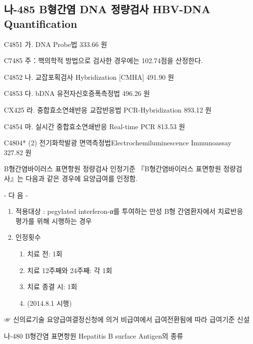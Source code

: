 \subsection{나-485 B형간염 DNA 정량검사 HBV-DNA Quantification}
C4851 가. DNA Probe법 333.66  원 \par
C7485 주：핵의학적 방법으로 검사한 경우에는 102.74점을 산정한다.\par
C4852 나. 교잡포획검사 Hybridization [CMHA] 491.90  원 \par
C4853 다. bDNA 유전자신호증폭측정법 496.26  원\par
CX425 라. 중합효소연쇄반응 교잡반응법 PCR-Hybridization 893.12  원\par
C4854 마. 실시간 중합효소연쇄반응 Real-time PCR 813.53  원\par
C4804* (2) 전기화학발광 면역측정법Electrochemiluminescence Immunoassay 327.82  원 \par

\begin{commentbox}{B형간염바이러스 표면항원 정량검사 인정기준}
『B형간염바이러스 표면항원 정량검사』는 다음과 같은 경우에 요양급여를 인정함. \par
- 다 음 -
\begin{enumerate}[가.]\tightlist
\item 적용대상 : pegylated interferon-α를 투여하는 만성 B형 간염환자에서 치료반응 평가를 위해 시행하는 경우
\item 인정횟수
	\begin{enumerate}[1)]\tightlist
	\item 치료 전: 1회
	\item 치료 12주째와 24주째: 각 1회
	\item 치료 종결 시: 1회
	\item (2014.8.1 시행)
  	\end{enumerate}
\end{enumerate}  	
☞ 신의료기술 요양급여결정신청에 의거 비급여에서 급여전환됨에 따라 급여기준 신설
\end{commentbox}

나-480 B형간염 표면항원 Hepatitis B surface Antigen의 종류\par

